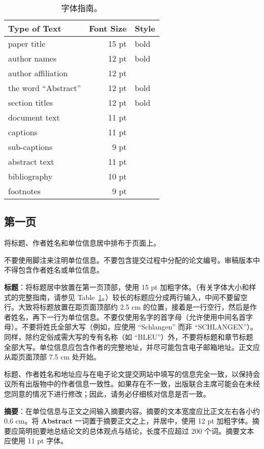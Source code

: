 \documentclass[11pt]{article}
\begin{document}
\begin{CJK*}{UTF8}{gbsn}
\begin{table}[h]
\begin{center}
\begin{tabular}{|l|rl|}
\hline \bf Type of Text & \bf Font Size & \bf Style \\ \hline
paper title & 15 pt & bold \\
author names & 12 pt & bold \\
author affiliation & 12 pt & \\
the word ``Abstract'' & 12 pt & bold \\
section titles & 12 pt & bold \\
document text & 11 pt  &\\
captions & 11 pt & \\
sub-captions & 9 pt & \\
abstract text & 11 pt & \\
bibliography & 10 pt & \\
footnotes & 9 pt & \\
\hline
\end{tabular}
\end{center}
\caption{\label{font-table} 字体指南。}
\end{table}
\subsection{第一页}
\label{ssec:first}

将标题、作者姓名和单位信息居中排布于页面上。

不要使用脚注来注明单位信息。不要包含提交过程中分配的论文编号。审稿版本中不得包含作者姓名或单位信息。

{\bf 标题}：将标题居中放置在第一页顶部，使用 15 pt 加粗字体。（有关字体大小和样式的完整指南，请参见 Table~\ref{font-table}。）较长的标题应分成两行输入，中间不要留空行。大致将标题放置在距页面顶部约 2.5 cm 的位置，接着是一行空行，然后是作者姓名，再下一行为单位信息。不要仅使用名字的首字母（允许使用中间名首字母）。不要将姓氏全部大写（例如，应使用 ``Schlangen'' 而非 ``SCHLANGEN''）。同样，除约定俗成需大写的专有名称（如 ``BLEU''）外，不要将标题和章节标题全部大写。单位信息应包含作者的完整地址，并尽可能包含电子邮箱地址。正文应从距页面顶部 7.5 cm 处开始。

标题、作者姓名和地址应与在电子论文提交网站中填写的信息完全一致，以保持会议所有出版物中的作者信息一致性。如果存在不一致，出版联合主席可能会在未经您同意的情况下进行修改；因此，请务必仔细核对信息是否一致。

{\bf 摘要}：在单位信息与正文之间输入摘要内容。摘要的文本宽度应比正文左右各小约 0.6 cm。将 {\bf Abstract} 一词置于摘要正文之上，并居中，使用 12 pt 加粗字体。摘要应简明扼要地总结论文的总体观点与结论，长度不应超过 200 个词。摘要文本应使用 11 pt 字体。


\end{CJK*}
\end{document}
